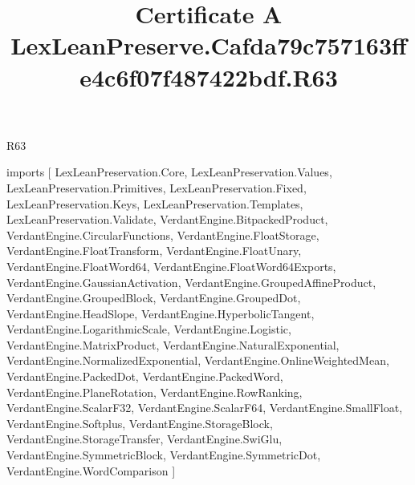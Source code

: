 \begin{lexlean}{R63}
\title{Certificate A LexLeanPreserve.Cafda79c757163ffe4c6f07f487422bdf.R63}
\begin{coremodule}
imports [
  LexLeanPreservation.Core,
  LexLeanPreservation.Values,
  LexLeanPreservation.Primitives,
  LexLeanPreservation.Fixed,
  LexLeanPreservation.Keys,
  LexLeanPreservation.Templates,
  LexLeanPreservation.Validate,
  VerdantEngine.BitpackedProduct,
  VerdantEngine.CircularFunctions,
  VerdantEngine.FloatStorage,
  VerdantEngine.FloatTransform,
  VerdantEngine.FloatUnary,
  VerdantEngine.FloatWord64,
  VerdantEngine.FloatWord64Exports,
  VerdantEngine.GaussianActivation,
  VerdantEngine.GroupedAffineProduct,
  VerdantEngine.GroupedBlock,
  VerdantEngine.GroupedDot,
  VerdantEngine.HeadSlope,
  VerdantEngine.HyperbolicTangent,
  VerdantEngine.LogarithmicScale,
  VerdantEngine.Logistic,
  VerdantEngine.MatrixProduct,
  VerdantEngine.NaturalExponential,
  VerdantEngine.NormalizedExponential,
  VerdantEngine.OnlineWeightedMean,
  VerdantEngine.PackedDot,
  VerdantEngine.PackedWord,
  VerdantEngine.PlaneRotation,
  VerdantEngine.RowRanking,
  VerdantEngine.ScalarF32,
  VerdantEngine.ScalarF64,
  VerdantEngine.SmallFloat,
  VerdantEngine.Softplus,
  VerdantEngine.StorageBlock,
  VerdantEngine.StorageTransfer,
  VerdantEngine.SwiGlu,
  VerdantEngine.SymmetricBlock,
  VerdantEngine.SymmetricDot,
  VerdantEngine.WordComparison
]


\end{coremodule}
\end{lexlean}
